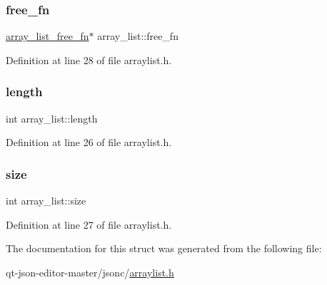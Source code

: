 \mbox{\label{structarray__list_ab7989cdde357e5c7819c562c7680ab74}} 
\subsubsection{\texorpdfstring{free\+\_\+fn}{free\_fn}}
{\footnotesize\ttfamily \hyperlink{arraylist_8h_a90d2ce204a483fa38f5514bad67222aa}{array\+\_\+list\+\_\+free\+\_\+fn}$\ast$ array\+\_\+list\+::free\+\_\+fn}



Definition at line 28 of file arraylist.\+h.

\mbox{\label{structarray__list_a442fcfde196a3cc95a647f0708de814d}} 
\subsubsection{\texorpdfstring{length}{length}}
{\footnotesize\ttfamily int array\+\_\+list\+::length}



Definition at line 26 of file arraylist.\+h.

\mbox{\label{structarray__list_aba48a197d3c8f1d56682da23fe883d0a}} 
\subsubsection{\texorpdfstring{size}{size}}
{\footnotesize\ttfamily int array\+\_\+list\+::size}



Definition at line 27 of file arraylist.\+h.



The documentation for this struct was generated from the following file\+:\begin{DoxyCompactItemize}
\item 
qt-\/json-\/editor-\/master/jsonc/\hyperlink{arraylist_8h}{arraylist.\+h}\end{DoxyCompactItemize}
